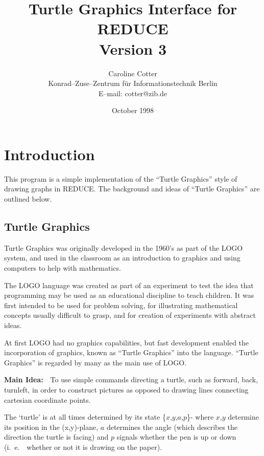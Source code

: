 \title{{\bf Turtle Graphics Interface for REDUCE \\
            Version 3}}
\author{Caroline Cotter \\ Konrad--Zuse--Zentrum f\"ur Informationstechnik
        Berlin \\ E--mail: cotter@zib.de}
\date{October 1998}
\newcommand{\syntax}{\textsl{SYNTAX: }}
\newcommand{\abb}{\textsl{Abbreviated form: }}



\maketitle


\section{Introduction}
 This program is a simple implementation of the ``Turtle Graphics''
style of drawing graphs in {\small REDUCE}. The background and ideas of
``Turtle Graphics'' are outlined below.

\subsection{Turtle Graphics}

 Turtle Graphics was originally developed in the 1960's as part of the
LOGO system, and used in the classroom as an introduction to graphics
and using computers to help with mathematics.

The LOGO language was created as part of an experiment to test the idea
that programming may be used as an educational discipline to teach children.
It was first intended to be used for problem solving, for illustrating
mathematical concepts usually difficult to grasp, and for creation of
experiments with abstract ideas.

At first LOGO had no graphics capabilities, but fast development enabled
the incorporation of graphics, known as ``Turtle Graphics'' into the
language. ``Turtle Graphics'' is regarded by many as the main use of
LOGO.


{\bf Main Idea:}\ \ To use simple commands directing a turtle, such as
forward, back, turnleft, in order to construct pictures as opposed to
drawing lines connecting cartesian coordinate points.

The `turtle' is at all times determined by its state \{$x$,$y$,$a$,$p$\}-
where $x$,$y$ determine its position in the {\mbox (x,y)-plane}, $a$
determines the angle (which describes the direction the turtle is
facing) and $p$ signals whether the pen is up or down (i.\ e.\ \  whether or
not it is drawing on the paper).


